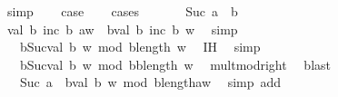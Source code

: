\begin{isabellebody}
\ simp\isanewline
\ \ \isamarkupfalse%
\ {\isacharquery}{\kern0pt}case\isanewline
\ \ \isamarkupfalse%
\ cases\isanewline
\ \ \ \ \isamarkupfalse%
\ {}{\isacharcolon}{\kern0pt}\ {\isachardoublequoteopen}Suc\ a\ {\isacharequal}{\kern0pt}\ b{\isachardoublequoteclose}\isanewline
\ \ \ \ \isamarkupfalse%
\ {\isachardoublequoteopen}val\ b\ {\isacharparenleft}{\kern0pt}inc\ b\ {\isacharparenleft}{\kern0pt}a{\isacharhash}{\kern0pt}w{\isacharparenright}{\kern0pt}{\isacharparenright}{\kern0pt}\ {\isacharequal}{\kern0pt}\ b{\isacharasterisk}{\kern0pt}val\ b\ {\isacharparenleft}{\kern0pt}inc\ b\ w{\isacharparenright}{\kern0pt}{\isachardoublequoteclose}\ \isamarkupfalse%
\ simp\isanewline
\ \ \ \ \isamarkupfalse%
\ \isamarkupfalse%
\ {\isachardoublequoteopen}{\isachardot}{\kern0pt}{\isachardot}{\kern0pt}{\isachardot}{\kern0pt}\ {\isacharequal}{\kern0pt}\ b{\isacharasterisk}{\kern0pt}{\isacharparenleft}{\kern0pt}Suc{\isacharparenleft}{\kern0pt}val\ b\ w{\isacharparenright}{\kern0pt}\ mod\ b{\isacharcircum}{\kern0pt}length\ w{\isacharparenright}{\kern0pt}{\isachardoublequoteclose}\ \isamarkupfalse%
\ IH\ \isamarkupfalse%
\ simp\isanewline
\ \ \ \ \isamarkupfalse%
\ \isamarkupfalse%
\ {\isachardoublequoteopen}{\isachardot}{\kern0pt}{\isachardot}{\kern0pt}{\isachardot}{\kern0pt}\ {\isacharequal}{\kern0pt}\ b{\isacharasterisk}{\kern0pt}Suc{\isacharparenleft}{\kern0pt}val\ b\ w{\isacharparenright}{\kern0pt}\ mod\ {\isacharparenleft}{\kern0pt}b{\isacharasterisk}{\kern0pt}b{\isacharcircum}{\kern0pt}length\ w{\isacharparenright}{\kern0pt}{\isachardoublequoteclose}\ \isamarkupfalse%
\ mult{\isacharunderscore}{\kern0pt}mod{\isacharunderscore}{\kern0pt}right\ \isamarkupfalse%
\ blast\isanewline
\ \ \ \ \isamarkupfalse%
\ \isamarkupfalse%
\ {\isachardoublequoteopen}{\isachardot}{\kern0pt}{\isachardot}{\kern0pt}{\isachardot}{\kern0pt}\ {\isacharequal}{\kern0pt}\ {\isacharparenleft}{\kern0pt}Suc\ a\ {\isacharplus}{\kern0pt}\ b{\isacharasterisk}{\kern0pt}val\ b\ w{\isacharparenright}{\kern0pt}\ mod\ {\isacharparenleft}{\kern0pt}b{\isacharcircum}{\kern0pt}length{\isacharparenleft}{\kern0pt}a{\isacharhash}{\kern0pt}w{\isacharparenright}{\kern0pt}{\isacharparenright}{\kern0pt}{\isachardoublequoteclose}\ \isamarkupfalse%
\ {\isacharparenleft}{\kern0pt}simp\ add{\isacharcolon}{\kern0pt}\ {\isachardoublequoteopen}{}{\isachardoublequoteclose}{\isacharparenright}{\kern0pt}\isanewline

\end{isabellebody}
